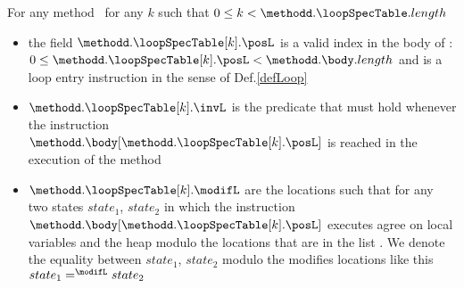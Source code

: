 For any method \methodd \ for any $ k $ such that $ 0 \leq k < \methodd.\loopSpecTable.length$ 
          \begin{itemize}
                \item the field $\methodd.\loopSpecTable[k].\posL$ is a valid index in the body of \methodd:\\
                      $ 0 \leq   \methodd.\loopSpecTable[k].\posL < \methodd.\body.length$ and is a loop entry
                      instruction in the sense of Def.\ref{defLoop}

	        \item $\methodd.\loopSpecTable[k].\invL$ is the predicate that must hold whenever the instruction \\
		      $\methodd.\body[ \methodd.\loopSpecTable[k].\posL]$ 
                      is  reached in the execution of the method \methodd

                \item $\methodd.\loopSpecTable[k].\modifL$ are the locations such that for any two states
                      $state_1$, $state_2 $  in which the instruction $\methodd.\body[ \methodd.\loopSpecTable[k].\posL]$ 
		      executes agree on local variables and the heap modulo the locations that are in the list \modifL.
                      We denote the equality between  $state_1$, $ state_2 $   modulo the modifies locations like this 
                      $ state_1 =^{\modifL} state_2$
	  \end{itemize}
